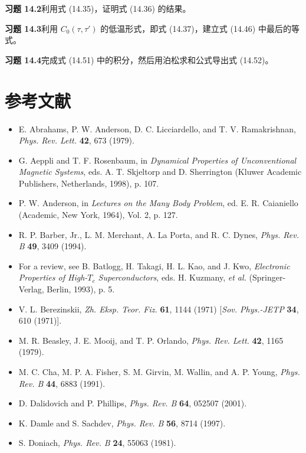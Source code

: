 \textbf{习题 14.2}\quad 利用式 (14.35)，证明式 (14.36) 的结果。

\textbf{习题 14.3}\quad 利用 $C_{0}(\tau,\tau')$ 的低温形式，即式 (14.37)，建立式 (14.46) 中最后的等式。

\textbf{习题 14.4}\quad 完成式 (14.51) 中的积分，然后用泊松求和公式导出式 (14.52)。

\section*{参考文献}

\begin{itemize}[leftmargin=2em,itemsep=0pt,parsep=0pt,label={}]
\item [AALR1979] E. Abrahams, P. W. Anderson, D. C. Licciardello, and T. V. Ramakrishnan, \emph{Phys. Rev. Lett.} \textbf{42}, 673 (1979).
\item [AR1998] G. Aeppli and T. F. Rosenbaum, in \emph{Dynamical Properties of Unconventional Magnetic Systems}, eds. A. T. Skjeltorp and D. Sherrington (Kluwer Academic Publishers, Netherlands, 1998), p. 107.
\item [A1964] P. W. Anderson, in \emph{Lectures on the Many Body Problem}, ed. E. R. Caianiello (Academic, New York, 1964), Vol. 2, p. 127.
\item [B1994] R. P. Barber, Jr., L. M. Merchant, A. La Porta, and R. C. Dynes, \emph{Phys. Rev. B} \textbf{49}, 3409 (1994).
\item [BTKW1993] For a review, see B. Batlogg, H. Takagi, H. L. Kao, and J. Kwo, \emph{Electronic Properties of High-$T_{c}$ Superconductors}, eds. H. Kuzmany, \emph{et al.} (Springer-Verlag, Berlin, 1993), p. 5.
\item [B1971] V. L. Berezinskii, \emph{Zh. Eksp. Teor. Fiz.} \textbf{61}, 1144 (1971) [\emph{Sov. Phys.-JETP} \textbf{34}, 610 (1971)].
\item [BMO1979] M. R. Beasley, J. E. Mooij, and T. P. Orlando, \emph{Phys. Rev. Lett.} \textbf{42}, 1165 (1979).
\item [C1991] M. C. Cha, M. P. A. Fisher, S. M. Girvin, M. Wallin, and A. P. Young, \emph{Phys. Rev. B} \textbf{44}, 6883 (1991).
\item [DP2001] D. Dalidovich and P. Phillips, \emph{Phys. Rev. B} \textbf{64}, 052507 (2001).
\item [DS1997] K. Damle and S. Sachdev, \emph{Phys. Rev. B} \textbf{56}, 8714 (1997).
\item [D1981] S. Doniach, \emph{Phys. Rev. B} \textbf{24}, 55063 (1981).

\end{itemize}
